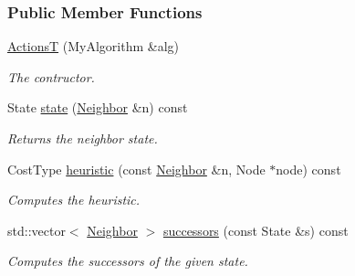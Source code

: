 \subsubsection*{Public Member Functions}
\begin{DoxyCompactItemize}
\item 
\hyperlink{structslb_1_1ext_1_1policy_1_1generator_1_1ActionsT_a97a7c0421ba9ffe63a6790d46bd85c8d}{ActionsT} (My\+Algorithm \&alg)
\begin{DoxyCompactList}\small\item\em The contructor. \end{DoxyCompactList}\item 
State \hyperlink{structslb_1_1ext_1_1policy_1_1generator_1_1ActionsT_a85db41225282eb0fab196a7df5fb25e7}{state} (\hyperlink{structslb_1_1ext_1_1policy_1_1generator_1_1ActionsT_a579c1e623b0e091ad02ab78edb271810}{Neighbor} \&n) const 
\begin{DoxyCompactList}\small\item\em Returns the neighbor state. \end{DoxyCompactList}\item 
Cost\+Type \hyperlink{structslb_1_1ext_1_1policy_1_1generator_1_1ActionsT_af3ce8c0f1dd2b233fc0873a1757c17c9}{heuristic} (const \hyperlink{structslb_1_1ext_1_1policy_1_1generator_1_1ActionsT_a579c1e623b0e091ad02ab78edb271810}{Neighbor} \&n, Node $\ast$node) const 
\begin{DoxyCompactList}\small\item\em Computes the heuristic. \end{DoxyCompactList}\item 
std\+::vector$<$ \hyperlink{structslb_1_1ext_1_1policy_1_1generator_1_1ActionsT_a579c1e623b0e091ad02ab78edb271810}{Neighbor} $>$ \hyperlink{structslb_1_1ext_1_1policy_1_1generator_1_1ActionsT_a3aca825a8f5f7b647b12ed3aa33f6076}{successors} (const State \&s) const 
\begin{DoxyCompactList}\small\item\em Computes the successors of the given state. \end{DoxyCompactList}\end{DoxyCompactItemize}
